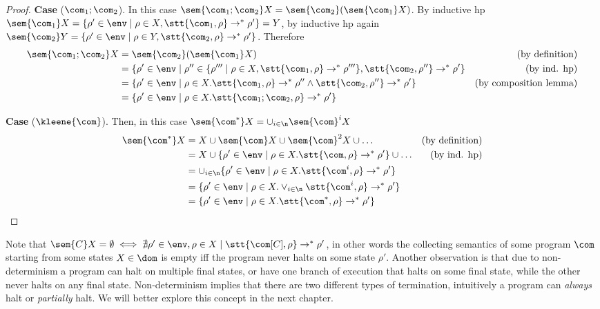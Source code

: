 \begin{proof}
  \noindent
  \textbf{Case} (\(\com_1;\com_2\)). In this case
  \(\sem{\com_1;\com_2}X = \sem{\com_2}(\sem{\com_1}X)\). By inductive
  hp
  \(\sem{\com_1}X = \{\rho' \in\env \mid \rho \in X, \stt{\com_1,
    \rho} \to^* \rho'\} = Y\), by inductive hp again
  \(\sem{\com_2}Y = \{\rho' \in\env \mid \rho \in Y, \stt{\com_2,
    \rho} \to^* \rho'\}\). Therefore
  \begin{align*}
    \sem{\com_1;\com_2}X & = \sem{\com_2}(\sem{\com_1}X) & \text{(by definition)}\\
                         & = \{\rho' \in\env \mid \rho'' \in \{\rho''' \mid \rho \in X, \stt{\com_1, \rho}  \to^* \rho'''\}, \stt{\com_2, \rho''} \to^* \rho'\} & \text{(by ind. hp)}\\
                         & = \{\rho' \in\env \mid \rho \in X . \stt{\com_1, \rho} \to^* \rho'' \wedge \stt{\com_2, \rho''} \to^* \rho'\} & \text{(by composition lemma)}\\
                         & = \{\rho' \in\env \mid \rho \in X . \stt{\com_1;\com_2, \rho} \to^* \rho'\}
  \end{align*}

  \medskip

  \noindent
  \textbf{Case} (\(\kleene{\com}\)).  Then, in this case
  \(\sem{\com^*}X = \cup_{i\in\n}\sem{\com}^i X\)
  \begin{align*}
    \sem{\com^*}X & = X \cup \sem{\com}X \cup \sem{\com}^2X \cup \dots & \text{(by definition)}\\
                  & = X \cup \{\rho' \in\env \mid \rho \in X . \stt{\com,\rho} \to^* \rho'\} \cup %
                    \dots & \text{(by ind. hp)}\\
                  & = \cup_{i\in\n} \{\rho' \in\env \mid \rho \in X . \stt{\com^i, \rho} \to^*  \rho'\} \\
                  & = \{\rho' \in\env \mid \rho \in X . \vee_{i\in\n} \stt{\com^i, \rho} \to^* \rho'\} \\
                  & = \{\rho' \in\env \mid \rho \in X . \stt{\com^*, \rho} \to^* \rho'\} \qedhere
  \end{align*} 
\end{proof}

Note that
\(\sem{C}X = \emptyset \iff \nexists \rho'\in\env, \rho \in X \mid
\stt{\com[C],\rho} \to^* \rho'\), in other words the collecting
semantics of some program \(\com\) starting from some states
\(X\in\dom\) is empty iff the program never halts on some state
\(\rho'\). Another observation is that due to non-determinism a
program can halt on multiple final states, or have one branch of
execution that halts on some final state, while the other never halts
on any final state. Non-determinism implies that there are two
different types of termination, intuitively a program can
\emph{always} halt or \emph{partially} halt. We will better explore
this concept in the next chapter.
